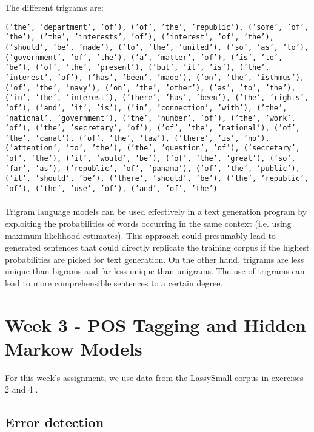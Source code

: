 \documentclass[a4paper, 11pt]{article}
\begin{document}
The different trigrams are:

\texttt{('the', 'department', 'of'), ('of', 'the', 'republic'), ('some', 'of', 'the'), ('the', 'interests', 'of'), ('interest', 'of', 'the'), ('should', 'be', 'made'), ('to', 'the', 'united'), ('so', 'as', 'to'), ('government', 'of', 'the'), ('a', 'matter', 'of'), ('is', 'to', 'be'), ('of', 'the', 'present'), ('but', 'it', 'is'), ('the', 'interest', 'of'), ('has', 'been', 'made'), ('on', 'the', 'isthmus'), ('of', 'the', 'navy'), ('on', 'the', 'other'), ('as', 'to', 'the'), ('in', 'the', 'interest'), ('there', 'has', 'been'), ('the', 'rights', 'of'), ('and', 'it', 'is'), ('in', 'connection', 'with'), ('the', 'national', 'government'), ('the', 'number', 'of'), ('the', 'work', 'of'), ('the', 'secretary', 'of'), ('of', 'the', 'national'), ('of', 'the', 'canal'), ('of', 'the', 'law'), ('there', 'is', 'no'), ('attention', 'to', 'the'), ('the', 'question', 'of'), ('secretary', 'of', 'the'), ('it', 'would', 'be'), ('of', 'the', 'great'), ('so', 'far', 'as'), ('republic', 'of', 'panama'), ('of', 'the', 'public'), ('it', 'should', 'be'), ('there', 'should', 'be'), ('the', 'republic', 'of'), ('the', 'use', 'of'), ('and', 'of', 'the')}\\

\noindent{}\\

Trigram language models can be used effectively in a text generation program by exploiting the probabilities of words occurring in the same context (i.e. using maximum likelihood estimates). This approach could presumably lead to generated sentences that could directly replicate the training corpus if the highest probabilities are picked for text generation. On the other hand, trigrams are less unique than bigrams and far less unique than unigrams. The use of trigrams can lead to more comprehensible sentences to a certain degree.

\section{Week 3 - POS Tagging and Hidden Markow Models}

For this week's assignment, we use data from the LassySmall corpus in exercises 2 and 4 \citep{vanNoord2013, bouma-van-noord-2017-increasing}.

\subsection{Error detection}
\end{document}
